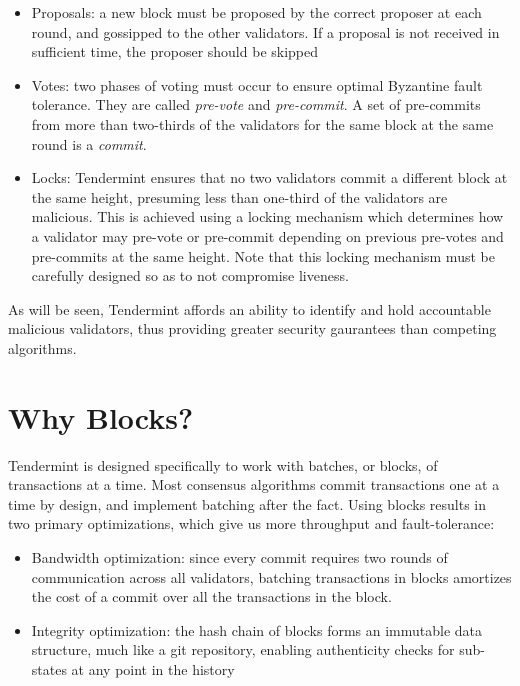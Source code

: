 \begin{itemize}

\item{Proposals: a new block must be proposed by the correct proposer at each round, and gossipped to the other validators. If a proposal is not received in sufficient time, the proposer should be skipped}

\item{Votes: two phases of voting must occur to ensure optimal Byzantine fault tolerance. They are called \emph{pre-vote} and \emph{pre-commit}. A set of pre-commits from more than two-thirds of the validators for the same block at the same round is a \emph{commit}.}

\item{Locks: Tendermint ensures that no two validators commit a different block at the same height, presuming less than one-third of the validators are malicious. This is achieved using a locking mechanism which determines how a validator may pre-vote or pre-commit depending on previous pre-votes and pre-commits at the same height. Note that this locking mechanism must be carefully designed so as to not compromise liveness.}

\end{itemize}

As will be seen, Tendermint affords an ability to identify and hold accountable malicious validators, thus providing greater security gaurantees than competing algorithms.

\section{Why Blocks?}

Tendermint is designed specifically to work with batches, or blocks, of transactions at a time.
Most consensus algorithms commit transactions one at a time by design, and implement batching after the fact.
Using blocks results in two primary optimizations, which give us more throughput and fault-tolerance:

\begin{itemize}
\item{Bandwidth optimization: since every commit requires two rounds of communication across all validators, 
	batching transactions in blocks amortizes the cost of a commit over all the transactions in the block.}
\item{Integrity optimization: the hash chain of blocks forms an immutable data structure, much like a git repository, enabling authenticity checks for sub-states at any point in the history}
\end{itemize}

